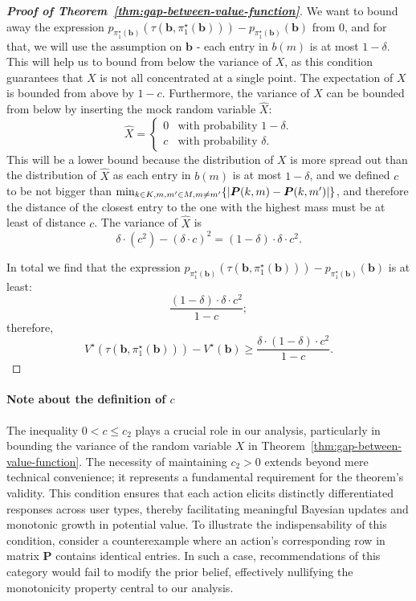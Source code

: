 \begin{proof}[\normalfont\bfseries Proof of Theorem~\ref{thm:gap-between-value-function}]
    We want to bound away the expression $p_{\pi^{\star}_1(\bm{b})}(\tau(\bm{b}, \pi^{\star}_1(\bm{b}))) - p_{\pi^{\star}_1(\bm{b})}(\bm{b})$ from $0$, and for that, we will use the assumption on $\bm b$ - each entry in $b(m)$ is at most $1 - \delta$. This will help us to bound from below the variance of $X$, as this condition guarantees that $X$ is not all concentrated at a single point.
    The expectation of $X$ is bounded from above by $1 - c$.
    Furthermore, the variance of $X$ can be bounded from below by inserting the mock random variable $\hat{X}$:
    \[
        \hat{X} = \begin{cases}
            0         & \text{with probability } 1 - \delta. \\
            c & \text{with probability } \delta.    
        \end{cases}
    \]
    This will be a lower bound because the distribution of $X$ is more spread out than the distribution of $\hat{X}$ as each entry in $b(m)$ is at most $1 - \delta$, and we defined $c$ to be not bigger than $\min_{k \in K, m, m' \in M, m \neq m'} \{ \lvert\bm{P}(k, m) - \bm{P}(k, m') \rvert \}$, and therefore the distance of the closest entry to the one with the highest mass must be at least of distance $c$.
    The variance of $\hat{X}$ is 
    \[
        \delta \cdot (c^2)- \left( \delta \cdot c \right)^2 = (1 - \delta) \cdot \delta \cdot c^2.
    \]

    In total we find that the expression $p_{\pi^{\star}_1(\bm{b})}(\tau(\bm{b}, \pi^{\star}_1(\bm{b}))) - p_{\pi^{\star}_1(\bm{b})}(\bm{b})$ is at least:
    \[
        \frac{(1 - \delta) \cdot \delta \cdot c^2}{1 - c};
    \]
therefore,
    \[
        V^{\star}(\tau(\bm{b}, \pi^{\star}_1(\bm{b}))) - V^{\star}(\bm{b}) \geq \frac{\delta \cdot (1 - \delta) \cdot c^2}{1 - c}.
    \]
\end{proof}

\paragraph{Note about the definition of $c$} The inequality $0 < c \leq c_2$ plays a crucial role in our analysis, particularly in bounding the variance of the random variable $X$ in Theorem~\ref{thm:gap-between-value-function}. The necessity of maintaining $c_2 > 0$ extends beyond mere technical convenience; it represents a fundamental requirement for the theorem's validity. This condition ensures that each action elicits distinctly differentiated responses across user types, thereby facilitating meaningful Bayesian updates and monotonic growth in potential value. To illustrate the indispensability of this condition, consider a counterexample where an action's corresponding row in matrix $\bm P$ contains identical entries. In such a case, recommendations of this category would fail to modify the prior belief, effectively nullifying the monotonicity property central to our analysis. 

